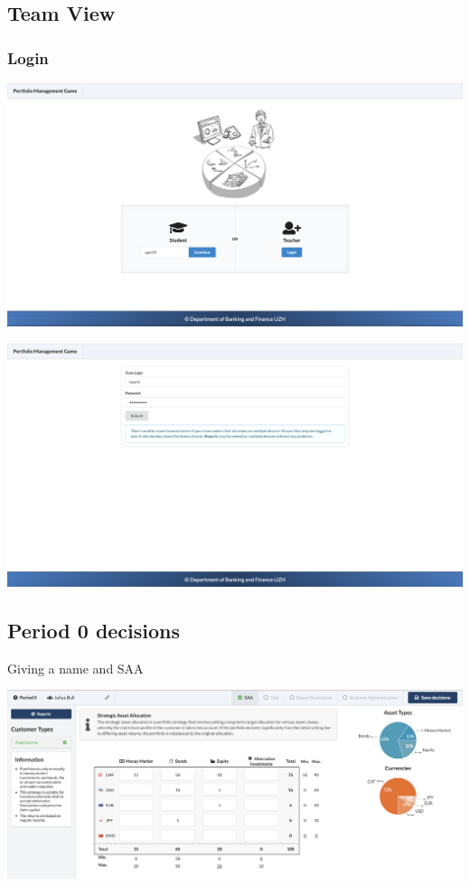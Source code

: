 \subsection{Team View}

\subsubsection{Login}
\begin{center}
  \includegraphics[scale=0.2]{img/application-overview/teams/startpage.png}
\end{center}
\begin{center}
  \includegraphics[scale=0.2]{img/application-overview/teams/login.png}
\end{center}

\subsection{Period 0 decisions}
Giving a name and SAA
\begin{center}
  \includegraphics[scale=0.2]{img/application-overview/teams/period_zero_decisions.png}
\end{center}
